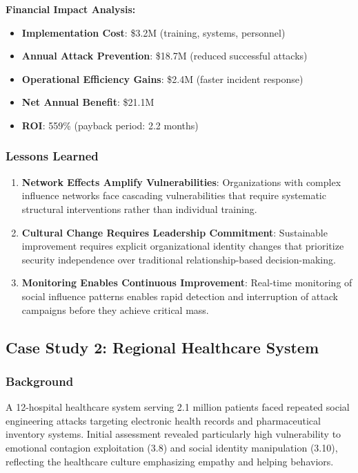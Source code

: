 \documentclass[11pt,a4paper]{article}
\begin{document}
\textbf{Financial Impact Analysis:}
\begin{itemize}
\item \textbf{Implementation Cost}: \$3.2M (training, systems, personnel)
\item \textbf{Annual Attack Prevention}: \$18.7M (reduced successful attacks)
\item \textbf{Operational Efficiency Gains}: \$2.4M (faster incident response)
\item \textbf{Net Annual Benefit}: \$21.1M
\item \textbf{ROI}: 559\% (payback period: 2.2 months)
\end{itemize}

\subsubsection{Lessons Learned}

\begin{enumerate}
\item \textbf{Network Effects Amplify Vulnerabilities}: Organizations with complex influence networks face cascading vulnerabilities that require systematic structural interventions rather than individual training.

\item \textbf{Cultural Change Requires Leadership Commitment}: Sustainable improvement requires explicit organizational identity changes that prioritize security independence over traditional relationship-based decision-making.

\item \textbf{Monitoring Enables Continuous Improvement}: Real-time monitoring of social influence patterns enables rapid detection and interruption of attack campaigns before they achieve critical mass.
\end{enumerate}

\subsection{Case Study 2: Regional Healthcare System}

\subsubsection{Background}

A 12-hospital healthcare system serving 2.1 million patients faced repeated social engineering attacks targeting electronic health records and pharmaceutical inventory systems. Initial assessment revealed particularly high vulnerability to emotional contagion exploitation (3.8) and social identity manipulation (3.10), reflecting the healthcare culture emphasizing empathy and helping behaviors.
\end{document}
